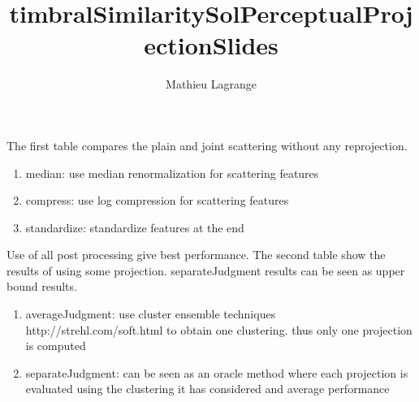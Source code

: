 \documentclass{beamer}
\title{timbralSimilaritySolPerceptualProjectionSlides}
\author{ Mathieu Lagrange }
\begin{document}
            
 
\maketitle            
 
 
The first table compares the plain and joint scattering without any reprojection.           
\begin{enumerate}           
\item median: use median renormalization for scattering features           
\item compress: use log compression for scattering features           
\item standardize: standardize features at the end           
\end{enumerate}           
Use of all post processing give best performance. The second table show the results of using some projection. separateJudgment results can be seen as upper bound results.           
 
\begin{enumerate}           
\item averageJudgment: use cluster ensemble techniques http://strehl.com/soft.html to obtain one clustering. thus only one projection is computed           
\item separateJudgment: can be seen as an oracle method where each projection is evaluated using the clustering it has considered and average performance           
\end{enumerate}           
 
 
 
 
 
\end{document}
